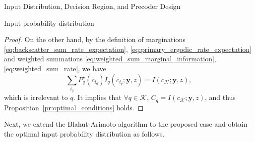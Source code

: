 \documentclass[journal]{IEEEtran}
\begin{document}
\begin{section}{Input Distribution, Decision Region, and Precoder Design}
\begin{subsection}{Input probability distribution}
\begin{proof}
				On the other hand, by the definition of marginations \eqref{eq:backscatter_sum_rate_expectation}, \eqref{eq:primary_ergodic_rate_expectation} and weighted summations \eqref{eq:weighted_sum_marginal_information}, \eqref{eq:weighted_sum_rate}, we have
				\begin{equation}
					\sum_{i_q} P_q^{\star}(\bar{c}_{i_q}) I_q(\bar{c}_{i_q};\boldsymbol{y},z) = I(c_{\mathcal{K}};\boldsymbol{y},z),
				\end{equation}
				which is irrelevant to $q$. It implies that $\forall q \in \mathcal{K}$, $C_q = I(c_{\mathcal{K}};\boldsymbol{y},z)$, and thus Proposition~\eqref{pr:optimal_conditions} holds.
			\end{proof}

			Next, we extend the Blahut-Arimoto algorithm to the proposed case and obtain the optimal input probability distribution as follows.


\end{subsection}
\end{section}
\end{document}
